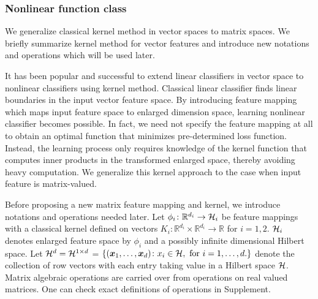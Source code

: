 \documentclass[12pt]{article}
\begin{document}
\subsubsection{Nonlinear function class}\label{subsec:nonlinear class}
We generalize classical kernel method in vector spaces to matrix spaces. We briefly summarize kernel method for vector features and introduce new notations and operations which will be used later.

It has been popular and successful to extend linear classifiers in vector space to nonlinear classifiers using kernel method. Classical linear classifier finds linear boundaries in the input vector feature space. By introducing feature mapping which maps input feature space to enlarged dimension space, learning nonlinear classifier becomes possible. In fact, we need not specify the feature mapping at all to obtain an optimal function that minimizes pre-determined loss function. Instead, the learning process only requires knowledge of the kernel function that computes inner products in the transformed enlarged space, thereby avoiding heavy computation. We generalize this kernel approach to the case when input feature is matrix-valued.


Before proposing a new matrix feature mapping and kernel, we introduce notations and operations needed later. Let $\phi_i\colon\mathbb{R}^{d_i}\rightarrow \mathcal{H}_i$ be feature mappings with a classical kernel defined on vectors $K_i\colon\mathbb{R}^{d_i}\times \mathbb{R}^{d_i}\rightarrow \mathbb{R}$ for $i = 1,2.$ $\mathcal{H}_i$ denotes enlarged feature space by $\phi_i$ and a possibly infinite dimensional Hilbert space. Let   $\mathcal{H}^d = \mathcal{H}^{1\times d}$ = $\{(\bm x_1,\ldots,\bm x_d)\colon x_{i}\in\mathcal{H},\text{ for } i = 1,\ldots, d.\}$ denote the collection of row vectors with each entry taking value in a Hilbert space $\mathcal{H}$.  Matrix algebraic operations are carried over from operations on real valued matrices. One can check exact definitions of operations in Supplement.
\end{document}

